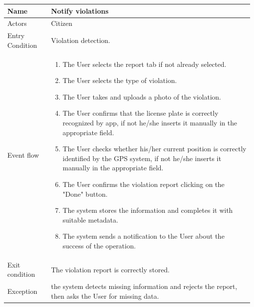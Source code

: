 \vskip 0.2in
\begin{tabular}{|p{3.1cm}|p{11.6cm}|}
\hline
Name & Notify violations\\
\hline
Actors & Citizen\\
\hline
Entry Condition & Violation detection.\\
\hline
Event flow & \begin{enumerate}
                \item The User selects the report tab if not already selected.
                \item The User selects the type of violation.
                \item The User takes and uploads a photo of the violation.
                \item The User confirms that the license plate is correctly recognized by app, if not he/she inserts it manually in the appropriate field.
                \item The User checks whether his/her current position is correctly identified by the GPS system, if not he/she inserts it manually in the appropriate field.
                \item The User confirms the violation report clicking on the "Done" button.
                \item The system stores the information and completes it with suitable metadata.
                \item The system sends a notification to the User about the success of the operation.
            \end{enumerate}\\
\hline
Exit condition & The violation report is correctly stored.\\
\hline
Exception & the system detects missing information and rejects the report, then asks the User for missing data.\\
\hline
\end{tabular}

